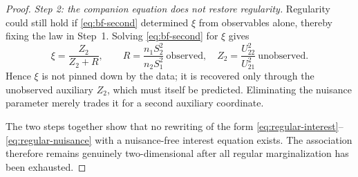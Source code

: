 \documentclass[10pt,a4paper]{amsart}
\begin{document}
\begin{proof}
\emph{Step 2: the companion equation does not restore regularity.}
Regularity could still hold if \eqref{eq:bf-second} determined \(\xi\) from
observables alone, thereby fixing the law in Step~1.  Solving
\eqref{eq:bf-second} for \(\xi\) gives
\[
\xi=\frac{Z_2}{Z_2+R},
\qquad
R=\frac{n_1S_2^2}{n_2S_1^2}\ \text{observed},\quad
Z_2=\frac{U_{22}^2}{U_{21}^2}\ \text{unobserved}.
\]
Hence \(\xi\) is not pinned down by the data; it is recovered only through the
unobserved auxiliary \(Z_2\), which must itself be predicted.  Eliminating the
nuisance parameter merely trades it for a second auxiliary coordinate.

The two steps together show that no rewriting of the form
\eqref{eq:regular-interest}--\eqref{eq:regular-nuisance} with a nuisance-free
interest equation exists.  The association therefore remains genuinely
two-dimensional after all regular marginalization has been exhausted.
\end{proof}
\end{document}
